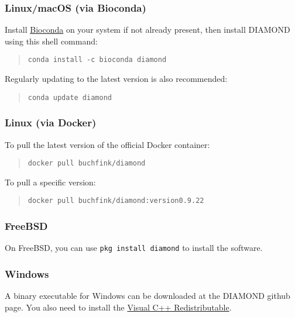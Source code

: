 \documentclass[11pt]{article}
\newcommand{\CURRENT}{0.9.22}
\begin{document}
\subsubsection{Linux/macOS (via Bioconda)}
Install \href{https://bioconda.github.io/}{Bioconda} on your system if not already present, then install DIAMOND using this shell command:
\begin{quote}
\texttt{conda install -c bioconda diamond}
\end{quote}
Regularly updating to the latest version is also recommended:
\begin{quote}
\texttt{conda update diamond}
\end{quote}

\subsubsection{Linux (via Docker)}
To pull the latest version of the official Docker container:
\begin{quote}
\texttt{docker pull buchfink/diamond}
\end{quote}
To pull a specific version:
\begin{quote}
\texttt{docker pull buchfink/diamond:version\CURRENT}
\end{quote}

\subsubsection{FreeBSD}
On FreeBSD, you can use \texttt{pkg install diamond} to install the software.

\subsubsection{Windows}
A binary executable for Windows can be downloaded at the DIAMOND github page. You also need to install the \href{https://www.microsoft.com/en-us/download/details.aspx?id=48145}{Visual C++ Redistributable}.
\end{document}
